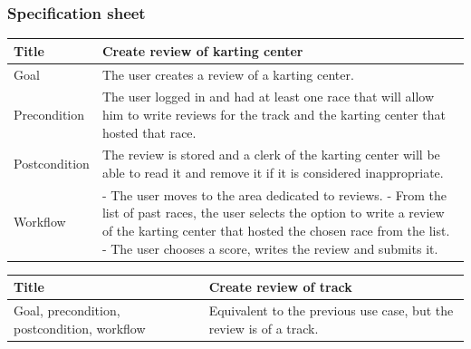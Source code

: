 \documentclass{beamer}
\begin{document}
\begin{frame}
    \frametitle{Specification sheet}
    \begin{table}
        \tiny
        \begin{tabular}{|p{2cm}|p{6cm}|}
        \hline
        Title & \textbf{Create review of karting center} \\
        \hline
        Goal & The user creates a review of a karting center. \\
        \hline
        Precondition & The user logged in and had at least one race that will allow him to write 
        reviews for the track and the karting center that hosted that race. \\
        \hline
        Postcondition & The review is stored and a clerk of the karting center will be able to 
        read it and remove it if it is considered inappropriate. \\
        \hline
        Workflow &
        - The user moves to the area dedicated to reviews. \newline
        - From the list of past races, the user selects the option to write a review of the karting center that
        hosted the chosen race from the list. \newline
        - The user chooses a score, writes the review and submits it. \\
        \hline
        \end{tabular}
    \end{table}

    \begin{table}
        \tiny
        \begin{tabular}{|p{2cm}|p{6cm}|}
        \hline
        Title & \textbf{Create review of track} \\
        \hline
        Goal, precondition, postcondition, workflow & Equivalent to the previous use case, but the review is of a track. \\
        \hline
        \end{tabular}
    \end{table}
\end{frame}
\end{document}
